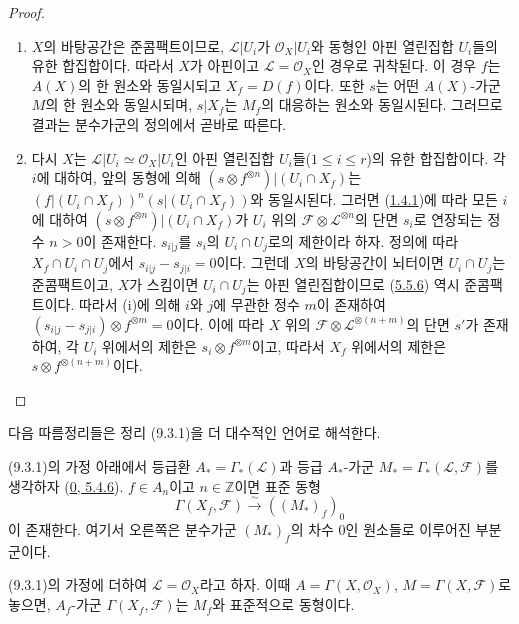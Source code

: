 \begin{proof}
\begin{enumerate}
\item[(i)] $X$의 바탕공간은 준콤팩트이므로,
  $\mathscr{L}|U_i$가 $\mathscr{O}_X|U_i$와 동형인 아핀 열린집합
  $U_i$들의 유한 합집합이다. 따라서 $X$가 아핀이고
  $\mathscr{L}=\mathscr{O}_X$인 경우로 귀착된다. 이 경우 $f$는
  $A(X)$의 한 원소와 동일시되고 $X_f=D(f)$이다. 또한 $s$는 어떤
  $A(X)$-가군 $M$의 한 원소와 동일시되며, $s|X_f$는 $M_f$의 대응하는
  원소와 동일시된다. 그러므로 결과는 분수가군의 정의에서 곧바로
  따른다.

\item[(ii)] 다시 $X$는 $\mathscr{L}|U_i\simeq\mathscr{O}_X|U_i$인 아핀
  열린집합 $U_i$들($1\leq i\leq r$)의 유한 합집합이다. 각 $i$에
  대하여, 앞의 동형에 의해
  $(s\otimes f^{\otimes n})|(U_i\cap X_f)$는
  $(f|(U_i\cap X_f))^n(s|(U_i\cap X_f))$와 동일시된다.
  그러면 (\hyperref[I.1.4.1-ko]{1.4.1})에 따라 모든 $i$에 대하여
  $(s\otimes f^{\otimes n})|(U_i\cap X_f)$가 $U_i$ 위의
  $\mathscr{F}\otimes\mathscr{L}^{\otimes n}$의 단면 $s_i$로 연장되는
  정수 $n>0$이 존재한다. $s_{i|j}$를 $s_i$의 $U_i\cap U_j$로의
  제한이라 하자. 정의에 따라 $X_f\cap U_i\cap U_j$에서
  $s_{i|j}-s_{j|i}=0$이다. 그런데 $X$의 바탕공간이 뇌터이면
  $U_i\cap U_j$는 준콤팩트이고, $X$가 스킴이면 $U_i\cap U_j$는 아핀
  열린집합이므로 (\hyperref[I.5.5.6-ko]{5.5.6}) 역시 준콤팩트이다.
  따라서 (i)에 의해 $i$와 $j$에 무관한 정수 $m$이 존재하여
  $(s_{i|j}-s_{j|i})\otimes f^{\otimes m}=0$이다. 이에 따라 $X$ 위의
  $\mathscr{F}\otimes\mathscr{L}^{\otimes(n+m)}$의 단면 $s'$가 존재하여,
  각 $U_i$ 위에서의 제한은 $s_i\otimes f^{\otimes m}$이고, 따라서
  $X_f$ 위에서의 제한은 $s\otimes f^{\otimes(n+m)}$이다.
\end{enumerate}
\end{proof}

다음 따름정리들은 정리 (9.3.1)을 더 대수적인 언어로 해석한다.

\begin{corollary}[9.3.2]
\label{I.9.3.2-ko}
(9.3.1)의 가정 아래에서 등급환 $A_* = \Gamma_*(\mathscr{L})$과
등급 $A_*$-가군 $M_* = \Gamma_*(\mathscr{L},\mathscr{F})$를 생각하자
(\hyperref[0.5.4.6-ko]{0, 5.4.6}). $f\in A_n$이고
$n\in\mathbb{Z}$이면 표준 동형
\[
  \Gamma(X_f,\mathscr{F})\xrightarrow{\sim}((M_*)_f)_0
\]
이 존재한다. 여기서 오른쪽은 분수가군 $(M_*)_f$의 차수 $0$인
원소들로 이루어진 부분군이다.
\end{corollary}

\begin{corollary}[9.3.3]
\label{I.9.3.3-ko}
(9.3.1)의 가정에 더하여 $\mathscr{L}=\mathscr{O}_X$라고 하자. 이때
$A=\Gamma(X,\mathscr{O}_X)$, $M=\Gamma(X,\mathscr{F})$로 놓으면,
$A_f$-가군 $\Gamma(X_f,\mathscr{F})$는 $M_f$와 표준적으로 동형이다.
\end{corollary}

